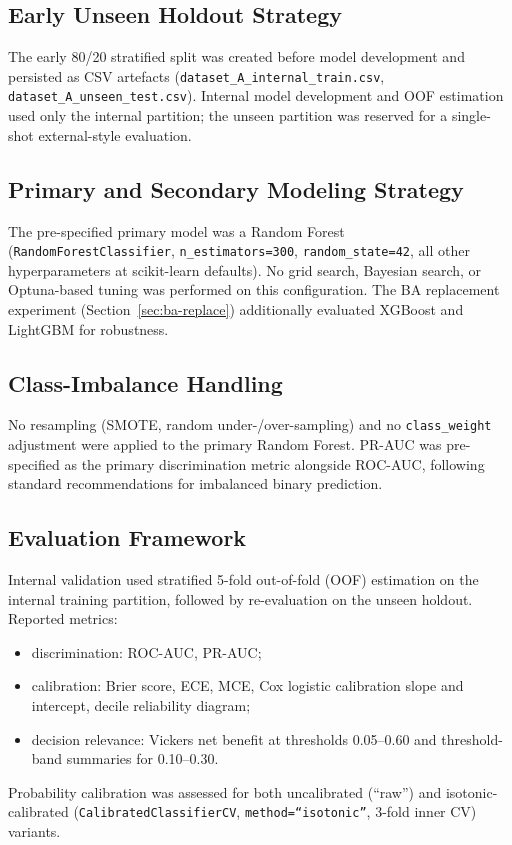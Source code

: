 \documentclass[11pt,a4paper]{article}
\begin{document}
\subsection{Early Unseen Holdout Strategy}
The early 80/20 stratified split was created before model development and persisted as CSV artefacts
(\texttt{dataset\_A\_internal\_train.csv}, \texttt{dataset\_A\_unseen\_test.csv}). Internal model
development and OOF estimation used only the internal partition; the unseen partition was reserved for
a single-shot external-style evaluation.

\subsection{Primary and Secondary Modeling Strategy}
The pre-specified primary model was a Random Forest (\texttt{RandomForestClassifier},
\texttt{n\_estimators=300}, \texttt{random\_state=42}, all other hyperparameters at scikit-learn
defaults). No grid search, Bayesian search, or Optuna-based tuning was performed on this configuration.
The BA replacement experiment (Section~\ref{sec:ba-replace}) additionally evaluated XGBoost and
LightGBM for robustness.

\subsection{Class-Imbalance Handling}
No resampling (SMOTE, random under-/over-sampling) and no \texttt{class\_weight} adjustment were
applied to the primary Random Forest. PR-AUC was pre-specified as the primary discrimination metric
alongside ROC-AUC, following standard recommendations for imbalanced binary prediction.

\subsection{Evaluation Framework}
Internal validation used stratified 5-fold out-of-fold (OOF) estimation on the internal training
partition, followed by re-evaluation on the unseen holdout. Reported metrics:
\begin{itemize}
\item discrimination: ROC-AUC, PR-AUC;
\item calibration: Brier score, ECE, MCE, Cox logistic calibration slope and intercept,
      decile reliability diagram;
\item decision relevance: Vickers net benefit at thresholds 0.05--0.60 and threshold-band
      summaries for 0.10--0.30.
\end{itemize}
Probability calibration was assessed for both uncalibrated (``raw'') and isotonic-calibrated
(\texttt{CalibratedClassifierCV}, \texttt{method=``isotonic''}, 3-fold inner CV) variants.
\end{document}
